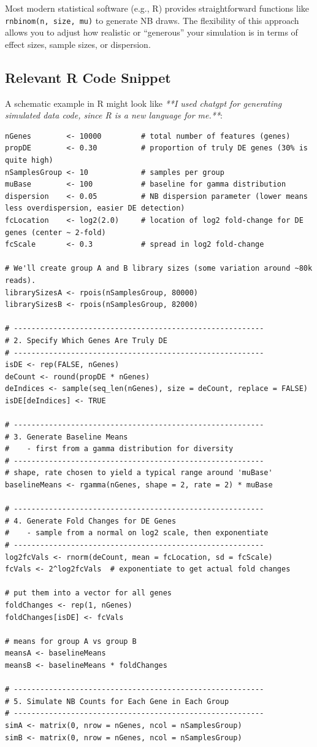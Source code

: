 \documentclass[12pt]{article}
\begin{document}
Most modern statistical software (e.g., \textsf{R}) provides straightforward functions like \texttt{rnbinom(n, size, mu)} to generate NB draws. The flexibility of this approach allows you to adjust how realistic or “generous” your simulation is in terms of effect sizes, sample sizes, or dispersion.

\subsection{Relevant R Code Snippet}
A schematic example in \textsf{R} might look like \textit{**I used chatgpt for generating simulated data code, since R is a new language for me.**}:
\begin{verbatim}
nGenes        <- 10000         # total number of features (genes)
propDE        <- 0.30          # proportion of truly DE genes (30% is quite high)
nSamplesGroup <- 10            # samples per group
muBase        <- 100           # baseline for gamma distribution
dispersion    <- 0.05          # NB dispersion parameter (lower means less overdispersion, easier DE detection)
fcLocation    <- log2(2.0)     # location of log2 fold-change for DE genes (center ~ 2-fold)
fcScale       <- 0.3           # spread in log2 fold-change

# We'll create group A and B library sizes (some variation around ~80k reads).
librarySizesA <- rpois(nSamplesGroup, 80000)
librarySizesB <- rpois(nSamplesGroup, 82000)

# ---------------------------------------------------------
# 2. Specify Which Genes Are Truly DE
# ---------------------------------------------------------
isDE <- rep(FALSE, nGenes)
deCount <- round(propDE * nGenes)
deIndices <- sample(seq_len(nGenes), size = deCount, replace = FALSE)
isDE[deIndices] <- TRUE

# ---------------------------------------------------------
# 3. Generate Baseline Means
#    - first from a gamma distribution for diversity
# ---------------------------------------------------------
# shape, rate chosen to yield a typical range around 'muBase'
baselineMeans <- rgamma(nGenes, shape = 2, rate = 2) * muBase

# ---------------------------------------------------------
# 4. Generate Fold Changes for DE Genes
#    - sample from a normal on log2 scale, then exponentiate
# ---------------------------------------------------------
log2fcVals <- rnorm(deCount, mean = fcLocation, sd = fcScale)
fcVals <- 2^log2fcVals  # exponentiate to get actual fold changes

# put them into a vector for all genes
foldChanges <- rep(1, nGenes)
foldChanges[isDE] <- fcVals

# means for group A vs group B
meansA <- baselineMeans
meansB <- baselineMeans * foldChanges

# ---------------------------------------------------------
# 5. Simulate NB Counts for Each Gene in Each Group
# ---------------------------------------------------------
simA <- matrix(0, nrow = nGenes, ncol = nSamplesGroup)
simB <- matrix(0, nrow = nGenes, ncol = nSamplesGroup)

\end{verbatim}
\end{document}
